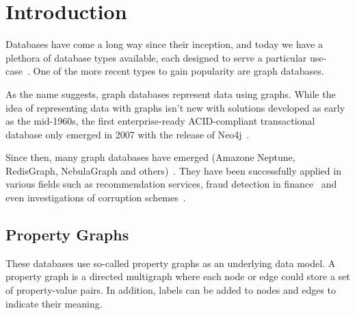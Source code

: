 \documentclass[14pt]{constructor-thesis}
\begin{document}
\maketitle
\tableofcontents
\section*{Introduction}

Databases have come a long way since their inception, and today we have a plethora of database types available, each designed to serve a particular use-case~\cite{database-types}. One of the more recent types to gain popularity are graph databases.

As the name suggests, graph databases represent data using graphs. While the idea of representing data with graphs isn't new with solutions developed as early as the mid-1960s, the first enterprise-ready ACID-compliant transactional database only emerged in 2007 with the release of Neo4j~\cite{enwiki:1146498781}.

Since then, many graph databases have emerged (Amazone Neptune, RedisGraph, NebulaGraph and others)~\cite{enwiki:1146498781}. They have been successfully applied in various fields such as recommendation services, fraud detection in finance~\cite{neo4j:use-cases} and even investigations of corruption schemes~\cite{icij:offshoreleaks}.

\subsection*{Property Graphs}

These databases use so-called property graphs as an underlying data model.
A property graph is a directed multigraph where each node or edge could
store a set of property-value pairs. In addition, labels can be added to nodes and edges to indicate their meaning.
\end{document}
